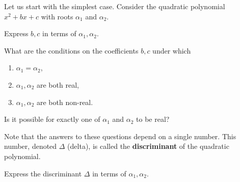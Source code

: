 Let us start with the simplest case. Consider the quadratic polynomial $ x^2 + bx + c$ with roots $ \alpha_1$ and $ \alpha_2$.
\begin{questions}
  \item Express $ b, c$ in terms of $ \alpha_1, \alpha_2$.
\end{questions}
\begin{questions}[resume]
	\item What are the conditions on the coefficients $ b,c$ under which
	\begin{enumerate}
		\item $ \alpha_1 = \alpha_2$,
		\item $ \alpha_1, \alpha_2$ are both real,
		\item $ \alpha_1, \alpha_2$ are both non-real.
	\end{enumerate}
	Is it possible for exactly one of $ \alpha_1$ and $ \alpha_2$ to be real?
\end{questions}
Note that the answers to these questions depend on a single number. This number, denoted $ \Delta$ (delta), is called the \textbf{discriminant} of the quadratic polynomial. 
	\begin{questions}[resume]
		  \item Express the discriminant $ \Delta$ in terms of $ \alpha_1, \alpha_2$.		
	\end{questions}

\newpage
